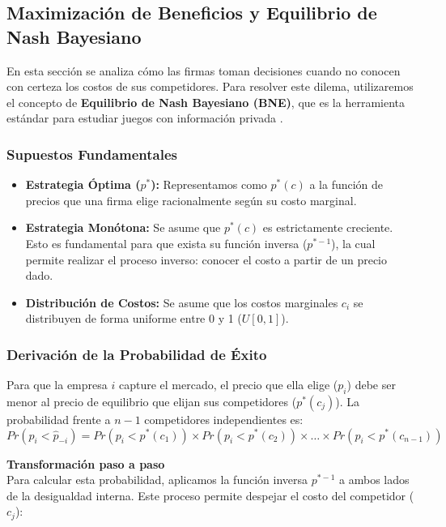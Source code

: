 \documentclass[12pt]{article}
\begin{document}
\subsection{Maximización de Beneficios y Equilibrio de Nash Bayesiano}

En esta sección se analiza cómo las firmas toman decisiones cuando no conocen con certeza los costos de sus competidores. Para resolver este dilema, utilizaremos el concepto de \textbf{Equilibrio de Nash Bayesiano (BNE)}, que es la herramienta estándar para estudiar juegos con información privada \cite{harsanyi}.

\subsubsection{Supuestos Fundamentales}
\begin{itemize}
    \item \textbf{Estrategia Óptima ($p^*$):} Representamos como $p^*(c)$ a la función de precios que una firma elige racionalmente según su costo marginal.
    \item \textbf{Estrategia Monótona:} Se asume que $p^*(c)$ es estrictamente creciente. Esto es fundamental para que exista su función inversa ($p^{*-1}$), la cual permite realizar el proceso inverso: conocer el costo a partir de un precio dado.
    \item \textbf{Distribución de Costos:} Se asume que los costos marginales $c_i$ se distribuyen de forma uniforme entre 0 y 1 ($U[0,1]$).
\end{itemize}

\subsubsection{Derivación de la Probabilidad de Éxito}
Para que la empresa $i$ capture el mercado, el precio que ella elige ($p_i$) debe ser menor al precio de equilibrio que elijan sus competidores ($p^*(c_j)$). La probabilidad frente a $n-1$ competidores independientes es:
\begin{equation}
    Pr(p_i < \hat{p}_{-i}) = Pr(p_i < p^*(c_1)) \times Pr(p_i < p^*(c_2)) \times \dots \times Pr(p_i < p^*(c_{n-1}))
\end{equation}

\noindent \textbf{Transformación paso a paso} \\ 
Para calcular esta probabilidad, aplicamos la función inversa $p^{*-1}$ a ambos lados de la desigualdad interna. Este proceso permite despejar el costo del competidor ($c_j$):
\end{document}
